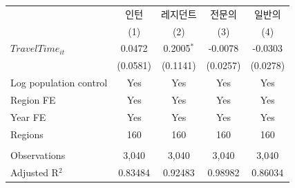 \begingroup
\centering
\begin{tabular}{lcccc}
   \toprule
                          & 인턴     & 레지던트     & 전문의   & 일반의 \\   
                          & (1)      & (2)          & (3)      & (4)\\  
   \midrule 
   $TravelTime_{it}$      & 0.0472   & 0.2005$^{*}$ & -0.0078  & -0.0303\\   
                          & (0.0581) & (0.1141)     & (0.0257) & (0.0278)\\   
   Log population control & Yes      & Yes          & Yes      & Yes\\  
   Region FE              & Yes      & Yes          & Yes      & Yes\\  
   Year FE                & Yes      & Yes          & Yes      & Yes\\  
   Regions                & 160      & 160          & 160      & 160\\  
    \\
   Observations           & 3,040    & 3,040        & 3,040    & 3,040\\  
   Adjusted R$^2$         & 0.83484  & 0.92483      & 0.98982  & 0.86034\\  
   \bottomrule
\end{tabular}
\par\endgroup
